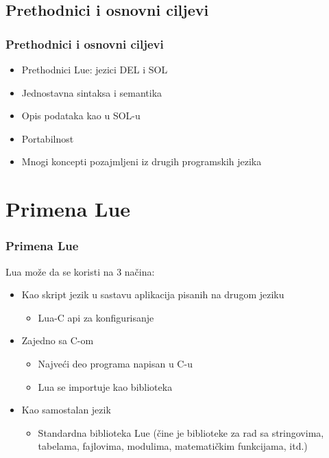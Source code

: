 \documentclass{beamer}
\begin{document}
\subsection{Prethodnici i osnovni ciljevi}
\begin{frame}
\frametitle{Prethodnici i osnovni ciljevi}

\begin{itemize}
\item Prethodnici Lue: jezici DEL i SOL

\item Jednostavna sintaksa i semantika

\item Opis podataka  kao  u  SOL-u   

\item Portabilnost  

\item  Mnogi koncepti pozajmljeni iz drugih programskih jezika

\end{itemize}
\end{frame}


\section{Primena Lue}
\begin{frame}
\frametitle{Primena Lue}

Lua može da se koristi na 3 načina:

\begin{itemize}

\item Kao skript jezik u sastavu aplikacija pisanih na drugom jeziku
\begin{itemize}
\item Lua-C api za konfigurisanje
\end{itemize}

\item Zajedno sa C-om
\begin{itemize}
\item Najveći deo programa napisan u C-u
\item Lua se importuje kao biblioteka
\end{itemize}

\item Kao samostalan jezik  
\begin{itemize}
\item Standardna biblioteka Lue (čine je biblioteke za rad sa stringovima, tabelama, fajlovima, modulima, matematičkim funkcijama, itd.)
\end{itemize}
 
\end{itemize}

\end{frame}
\end{document}
